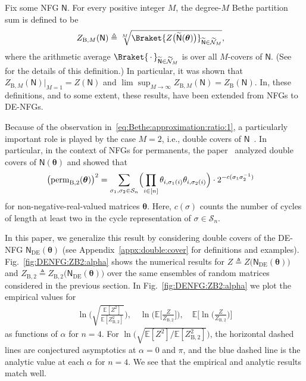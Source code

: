 \documentclass[conference]{IEEEtran}
\theoremstyle{plain}
\theoremstyle{definition}
\newcommand{\B}{\mathrm{B}}
\newcommand{\E}{\mathbb {E}}
\newcommand{\sfn}{\mathsf{N}}
\newcommand{\perm}{\operatorname{perm}}
\newcommand{\btheta}{\boldsymbol{\theta}}
\newcommand{\defeq}{\triangleq}
\newcommand{\sfnDE}{\sfn_{\mathrm{DE}}}
\begin{document}

Fix some NFG $\sfn$. For every positive integer $M$, the degree-$M$ Bethe
partition sum is defined to be
\begin{align*}
 Z_{\B,M}(\sfn)
  & \defeq
 \sqrt[M]{\Braket{Z\bigl(\widetilde{\sfn}(\btheta)\bigr)}_{\widetilde{\sfn}\in\widetilde{\mathcal N}_M}},
\end{align*}
where the arithmetic average
$\Braket{\,\cdot\,}_{\widetilde{\sfn}\in\widetilde{\mathcal N}_M}$ is over all
$M$-covers of $\sfn$. (See~\cite{vontobelCountingGraphCovers2013} for the
details of this definition.) In particular, it was shown that
$Z_{\B,M}(\sfn) \big|_{M = 1} = Z(\sfn)$ and
$\lim\sup_{M \to \infty} Z_{\B,M}(\sfn) =
 Z_{\B}(\sfn)$. In\cite{huangCharacterizingBethePartition2020,
 huangGraphcoverbasedCharacterizationBethe2025}, these definitions, and to some
extent, these results, have been extended from NFGs to DE-NFGs.


Because of the observation in~\eqref{eq:Bethe:approximation:ratio:1}, a
particularly important role is played by the case $M = 2$, i.e., double covers
of $\sfn$~\cite{vontobelUnderstandingRatioPartition2025}. In particular, in the
context of NFGs for permanents, the
paper~\cite{ngDoublecoverbasedAnalysisBethe2022} analyzed double covers of
$\sfn(\btheta)$ and showed that
\begin{align*}
 \bigl(\perm_{\B,2}(\btheta)\bigr)^2
  & = \sum_{\sigma_1,\sigma_2\in \mathcal{S}_n}
 \Bigl(
 \prod_{i\in[n]}
 \theta_{i,\sigma_1(i)}
 \theta_{i,\sigma_2(i)}
 \Bigr)
 \cdot
 2^{-c(\sigma_1\sigma_2^{-1})}
\end{align*}
for non-negative-real-valued matrices $\btheta$. Here, $c(\sigma)$ counts the
number of cycles of length at least two in the cycle representation of
$\sigma \in \mathcal{S}_n$.


In this paper, we generalize this result by considering double covers of the
DE-NFG $\sfnDE(\btheta)$ (see \iflongversion Appendix~\ref{appx:double:cover}
\else \cite{zhou2026} \fi for definitions and examples).
Fig.~\ref{fig:DENFG:ZB2:alpha} shows the numerical results for $Z \defeq
Z\bigl( \sfnDE(\btheta) \bigr)$ and $Z_{\B,2} \defeq Z_{\B,2}\bigl(
\sfnDE(\btheta) \bigr)$ over the same ensembles of random matrices considered
in the previous section. In Fig.~\ref{fig:DENFG:ZB2:alpha} we plot the
empirical values for
\begin{align*}
 \ln\biggl( \sqrt{\frac{\E[Z^2]}{\E[Z^2_{\B,2}]}} \biggr),
 \quad
 \ln\biggl( \E\biggl[\frac{Z}{Z_{\B,2}}\biggr] \biggr),
 \quad
 \E\biggl[\ln\biggl( \frac{Z}{Z_{\B,2}} \biggr) \biggr]
\end{align*}
as functions of $\alpha$ for $n=4$. For
$\ln\bigl( \sqrt{ \E[Z^2] / \E[Z^2_{\B,2}]} \bigr)$, the
horizontal dashed lines are conjectured asymptotics at $\alpha=0$ and $\pi$,
and the blue dashed line is the analytic value at each $\alpha$ for $n=4$. We
see that the empirical and analytic results match well.
\end{document}
